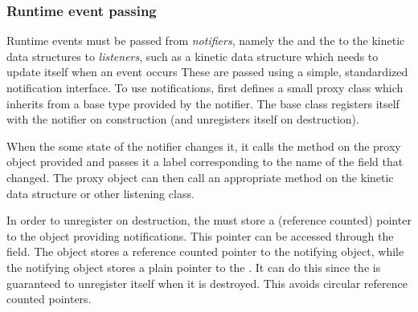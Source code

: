 \subsubsection{Runtime event passing}

Runtime events must be passed from \textit{notifiers}, namely the
 and the  to the kinetic data structures to
\textit{listeners}, such as a kinetic data structure which needs to
update itself when an event occurs These are passed using a simple,
standardized notification interface. To use notifications, first
defines a small proxy class which inherits from a  base
type provided by the notifier. The  base class registers
itself with the notifier on construction (and unregisters itself on
destruction).

When the some state of the notifier changes it, it calls the
 method on the proxy object provided and passes
it a label corresponding to the name of the field that changed. The
proxy object can then call an appropriate method on the kinetic data
structure or other listening class.

In order to unregister on destruction, the  must store a
(reference counted) pointer to the object providing
notifications. This pointer can be accessed through the 
field. The  object stores a reference counted pointer to
the notifying object, while the notifying object stores a plain
pointer to the . It can do this since the 
is guaranteed to unregister itself when it is destroyed. This avoids
circular reference counted pointers.

